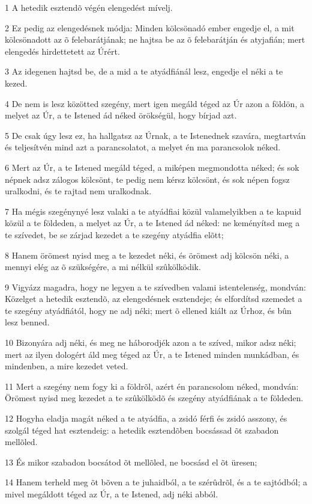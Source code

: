 \par 1 A hetedik esztendõ végén elengedést mívelj.
\par 2 Ez pedig az elengedésnek módja: Minden kölcsönadó ember engedje el, a mit kölcsönadott az õ felebarátjának; ne hajtsa be az õ felebarátján és atyjafián; mert elengedés hirdettetett az Úrért.
\par 3 Az idegenen hajtsd be, de a mid a te atyádfiánál lesz, engedje el néki a te kezed.
\par 4 De nem is lesz közötted szegény, mert igen megáld téged az Úr azon a földön, a melyet az Úr, a te Istened ád néked örökségül, hogy bírjad azt.
\par 5 De csak úgy lesz ez, ha hallgatsz az Úrnak, a te Istenednek szavára, megtartván és teljesítvén mind azt a parancsolatot, a melyet én ma parancsolok néked.
\par 6 Mert az Úr, a te Istened megáld téged, a miképen megmondotta néked; és sok népnek adsz zálogos kölcsönt, te pedig nem kérsz kölcsönt, és sok népen fogsz uralkodni, és te rajtad nem uralkodnak.
\par 7 Ha mégis szegénynyé lesz valaki a te atyádfiai közül valamelyikben a te kapuid közül a te földeden, a melyet az Úr, a te Istened ád néked: ne keményítsd meg a te szívedet, be se zárjad kezedet a te szegény atyádfia elõtt;
\par 8 Hanem örömest nyisd meg a te kezedet néki, és örömest adj kölcsön néki, a mennyi elég az õ szükségére, a mi nélkül szûkölködik.
\par 9 Vigyázz magadra, hogy ne legyen a te szívedben valami istentelenség, mondván: Közelget a hetedik esztendõ, az elengedésnek esztendeje; és elfordítsd szemedet a te szegény atyádfiától, hogy ne adj néki; mert õ ellened kiált az Úrhoz, és bûn lesz benned.
\par 10 Bizonyára adj néki, és meg ne háborodjék azon a te szíved, mikor adsz néki; mert az ilyen dologért áld meg téged az Úr, a te Istened minden munkádban, és mindenben, a mire kezedet veted.
\par 11 Mert a szegény nem fogy ki a földrõl, azért én parancsolom néked, mondván: Örömest nyisd meg kezedet a te szûkölködõ és  szegény atyádfiának a te földeden.
\par 12 Hogyha eladja magát néked a te atyádfia, a zsidó férfi és zsidó asszony, és szolgál téged hat esztendeig: a hetedik esztendõben bocsássad õt szabadon mellõled.
\par 13 És mikor szabadon bocsátod õt mellõled, ne bocsásd el õt üresen;
\par 14 Hanem terheld meg õt bõven a te juhaidból, a te szérûdrõl, és a te sajtódból; a mivel megáldott téged az Úr, a te Istened, adj néki abból.
